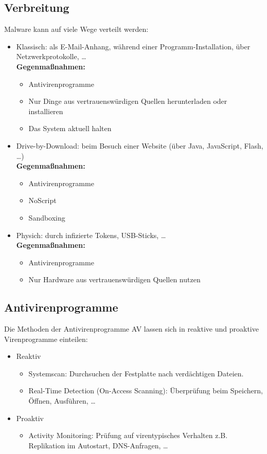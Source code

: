 		\subsection{Verbreitung}
			Malware kann auf viele Wege verteilt werden:
			\begin{itemize}
				\item Klassisch: als E-Mail-Anhang, während einer Programm-Installation, über Netzwerkprotokolle, \dots \\ \textbf{Gegenmaßnahmen:}
					\begin{itemize}
						\item Antivirenprogramme
						\item Nur Dinge aus vertrauenswürdigen Quellen herunterladen oder installieren
						\item Das System aktuell halten
					\end{itemize}
				\item Drive-by-Download: beim Besuch einer Website (über Java, JavaScript, Flash, \dots) \\ \textbf{Gegenmaßnahmen:}
					\begin{itemize}
						\item Antivirenprogramme
						\item NoScript
						\item Sandboxing
					\end{itemize}
				\item Physich: durch infizierte Tokens, USB-Sticks, \dots \\ \textbf{Gegenmaßnahmen:}
					\begin{itemize}
						\item Antivirenprogramme
						\item Nur Hardware aus vertrauenswürdigen Quellen nutzen
					\end{itemize}
			\end{itemize}

		\subsection{Antivirenprogramme}
			Die Methoden der Antivirenprogramme AV lassen sich in reaktive und proaktive Virenprogramme einteilen:
			\begin{itemize}
				\item Reaktiv
					\begin{itemize}
						\item Systemscan: Durchsuchen der Festplatte nach verdächtigen Dateien.
						\item Real-Time Detection (On-Access Scanning): Überprüfung beim Speichern, Öffnen, Ausführen, \dots
					\end{itemize}
				\item Proaktiv
					\begin{itemize}
						\item Activity Monitoring: Prüfung auf virentypisches Verhalten z.B. Replikation im Autostart, DNS-Anfragen, \dots
					\end{itemize}
			\end{itemize}

